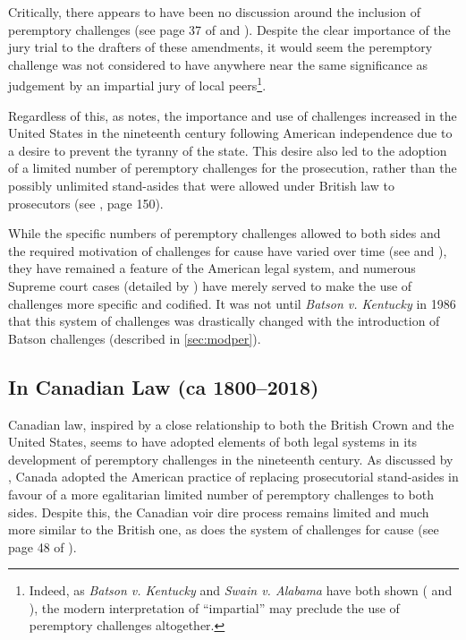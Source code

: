 Critically, there appears to have been no discussion around the inclusion of peremptory challenges (see page 37 of
\cite{hansvidjudging} and \cite{hoffman1997}). Despite the clear importance of the jury trial to the drafters of these amendments,
it would seem the peremptory challenge was not considered to have anywhere near the same significance as judgement by an impartial
jury of local peers\footnote{Indeed, as \textit{Batson v. Kentucky} and \textit{Swain v. Alabama} have both shown
  (\cite{batsonvkentucky} and \cite{swainvalabama}), the modern interpretation of ``impartial'' may preclude the use of
  peremptory challenges altogether.}.

Regardless of this, as \cite{brown2000} notes, the importance and use of challenges increased in the United States in the
nineteenth century following American independence due to a desire to prevent the tyranny of the state. This desire also led to
the adoption of a limited number of peremptory challenges for the prosecution, rather than the possibly unlimited stand-asides
that were allowed under British law to prosecutors (see \cite{vandykejurysel}, page 150).

While the specific numbers of peremptory challenges allowed to both sides and the required motivation of challenges for cause have
varied over time (see \cite{hoffman1997} and \cite{brown2000}), they have remained a feature of the American legal system, and
numerous Supreme court cases (detailed by \cite{hoffman1997}) have merely served to make the use of challenges more specific and
codified. It was not until \textit{Batson v. Kentucky} in 1986 that this system of challenges was drastically changed with the
introduction of Batson challenges (described in \ref{sec:modper}).

\subsection{In Canadian Law (ca 1800--2018)}

Canadian law, inspired by a close relationship to both the British Crown and the United States, seems to have adopted elements of
both legal systems in its development of peremptory challenges in the nineteenth century. As discussed by \cite{brown2000}, Canada
adopted the American practice of replacing prosecutorial stand-asides in favour of a more egalitarian limited number of peremptory
challenges to both sides. Despite this, the Canadian voir dire process remains limited and much more similar to the British one,
as does the system of challenges for cause (see page 48 of \cite{hansvidjudging}).

